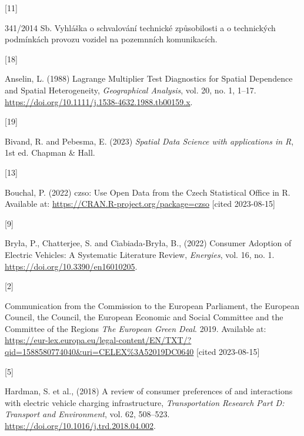 \documentclass{mmeproc}
\newlength{\cslhangindent}
\newlength{\csllabelwidth}
\newenvironment{CSLReferences}[2] %
 {%
  \setlength{\parindent}{0pt}
  \ifodd #1
  \fi
  \setlength{\parskip}{-2pt}
 }%
 {}
\newcommand{\CSLLeftMargin}[1]{\parbox[t]{\csllabelwidth}{#1}}
\newcommand{\CSLRightInline}[1]{\parbox[t]{\linewidth - \csllabelwidth}{#1}\break}
\begin{document}
\hfill

\hypertarget{refs}{}
\begin{CSLReferences}{0}{0}

\leavevmode{}%
\CSLLeftMargin{{[}11{]} }%
\CSLRightInline{{341/2014 {Sb}. {Vyhláška} o schvalování technické
způsobilosti a o technických podmínkách provozu vozidel na pozemnních
komunikacích.} }

\leavevmode{}%
\CSLLeftMargin{{[}18{]} }%
\CSLRightInline{Anselin, L. (1988) {Lagrange {Multiplier} {Test}
{Diagnostics} for {Spatial} {Dependence} and {Spatial}
{Heterogeneity},} \emph{Geographical Analysis}, vol. 20, no. 1,
1--17. \url{https://doi.org/10.1111/j.1538-4632.1988.tb00159.x}.}

\leavevmode{}%
\CSLLeftMargin{{[}19{]} }%
\CSLRightInline{Bivand, R. and Pebesma, E. (2023) \emph{Spatial {Data} {Science}
with applications in {R}}, 1st ed. Chapman \& Hall.}

\leavevmode{}%
\CSLLeftMargin{{[}13{]} }%
\CSLRightInline{Bouchal, P. (2022) {{czso}: {Use} {Open} {Data} from the
{Czech} {Statistical} {Office} in {R}.} Available at:
\url{https://CRAN.R-project.org/package=czso} {{[}cited 2023-08-15{]}}}

\leavevmode{}%
\CSLLeftMargin{{[}9{]} }%
\CSLRightInline{Bryła, P., Chatterjee, S. and Ciabiada-Bryła, B., (2022)
{Consumer {Adoption} of {Electric} {Vehicles}: {A} {Systematic}
{Literature} {Review},} \emph{Energies}, vol. 16, no. 1.
\url{https://doi.org/10.3390/en16010205}.}

\leavevmode{}%
\CSLLeftMargin{{[}2{]} }%
\CSLRightInline{{Communication from the {Commission} to the {European}
{Parliament}, the {European} {Council}, the {Council}, the {European}
{Economic} and {Social} {Committee} and the {Committee} of the {Regions} \emph{{The} {European} {Green} {Deal}}.} 2019. Available at:
\url{https://eur-lex.europa.eu/legal-content/EN/TXT/?qid=1588580774040\&uri=CELEX\%3A52019DC0640} {{[}cited 2023-08-15{]}}}

\leavevmode{}%
\CSLLeftMargin{{[}5{]} }%
\CSLRightInline{Hardman, S. et al., (2018) {A review of consumer
preferences of and interactions with electric vehicle charging
infrastructure,} \emph{Transportation Research Part D: Transport and
Environment}, vol. 62, 508--523. \url{https://doi.org/10.1016/j.trd.2018.04.002}.}


\end{CSLReferences}
\end{document}
